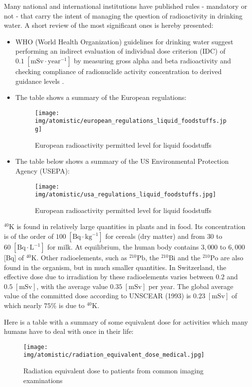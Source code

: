 	Many national and international institutions have published rules - mandatory or not - that carry the intent of managing the question of radioactivity in drinking water. A short review of the most significant ones is hereby presented:
	
	\begin{itemize}
		\item WHO (World Health Organization) guidelines for drinking water suggest performing an indirect evaluation of individual dose criterion (IDC) of $0.1\; [\text{mSv}\cdot\text{year}^{-1}]$ by measuring gross alpha and beta radioactivity and checking compliance of radionuclide activity concentration to derived guidance levels .
		
		\item The table shows a summary of the European regulations:
		\begin{figure}[H]
			\centering
			\texttt{[image: img/atomistic/european\_regulations\_liquid\_foodstuffs.jpg]}
			\caption[]{European radioactivity permitted level for liquid foodstuffs}
		\end{figure}
		
		\item The table below shows a summary of the US Environmental Protection Agency (USEPA):
		\begin{figure}[H]
			\centering
			\texttt{[image: img/atomistic/usa\_regulations\_liquid\_foodstuffs.jpg]}
			\caption[]{European radioactivity permitted level for liquid foodstuffs}
		\end{figure}
	\end{itemize}
	$^{40}\mathrm{K}$ is found in relatively large quantities in plants and in food. Its concentration is of the order of $100\;[\text{Bq}\cdot\text{kg}^{-1}]$ for cereals (dry matter) and from $30$ to $60\;[\text{Bq}\cdot\text{L}^{-1}]$ for milk. At equilibrium, the human body contains $3,000$ to $6,000$ [Bq] of $^{40}\mathrm{K}$. Other radioelements, such as $^{210}\mathrm{Pb}$, the $^{210}\mathrm{Bi}$ and the $^{210}\mathrm{Po}$ are also found in the organism, but in much smaller quantities. In Switzerland, the effective dose due to irradiation by these radioelements varies between $0.2$ and $0.5\;[\mathrm{mSv}]$, with the average value $0.35\;[\mathrm {mSv}] $ per year. The global average value of the committed dose according to UNSCEAR (1993) is $0.23\;[\mathrm {mSv}]$ of which nearly $75\% $ is due to $^{40}\mathrm{K}$.
	
	Here is a table with a summary of some equivalent dose for activities which many humans have to deal with once in their life:
	\begin{figure}[H]
		\centering
		\texttt{[image: img/atomistic/radiation\_equivalent\_dose\_medical.jpg]}
		\caption{Radiation equivalent dose to patients from common imaging examinations}
	\end{figure}
	
